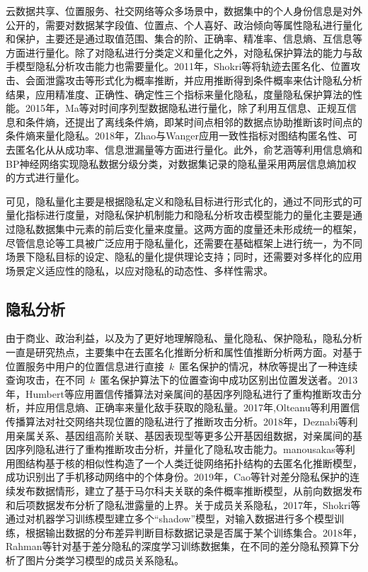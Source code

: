云数据共享、位置服务、社交网络等众多场景中，数据集中的个人身份信息是对外公开的，需要对数据某字段值、位置点、个人喜好、政治倾向等属性隐私进行量化和保护，主要还是通过取值范围、集合的阶、正确率、精准率、信息熵、互信息等方面进行量化\cite{xiong2018research,wagner2018technical}。除了对隐私进行分类定义和量化之外，对隐私保护算法的能力与敌手模型隐私分析攻击能力也需要量化。2011年，Shokri等\cite{shokri2011quantifying}将轨迹去匿名化、位置攻击、会面泄露攻击等形式化为概率推断，并应用推断得到条件概率来估计隐私分析结果，应用精准度、正确性、确定性三个指标来量化隐私，度量隐私保护算法的性能。2015年，Ma等\cite{ma2015information}对时间序列型数据隐私进行量化，除了利用互信息、正规互信息和条件熵，还提出了离线条件熵，即某时间点相邻的数据点协助推断该时间点的条件熵来量化隐私。2018年，Zhao与Wanger\cite{zhao2018evaluating}应用一致性指标对图结构匿名性、可去匿名化从从成功率、信息泄漏量等方面进行量化。此外，俞艺涵等\cite{yu2018shannon}利用信息熵和BP神经网络实现隐私数据分级分类，对数据集记录的隐私量采用两层信息熵加权的方式进行量化。

可见，隐私量化主要是根据隐私定义和隐私目标进行形式化的，通过不同形式的可量化指标进行度量，对隐私保护机制能力和隐私分析攻击模型能力的量化主要是通过隐私数据集中元素的前后变化量来度量。这两方面的度量还未形成统一的框架，尽管信息论等工具被广泛应用于隐私量化，还需要在基础框架上进行统一，为不同场景下隐私目标的设定、隐私的量化提供理论支持；同时，还需要对多样化的应用场景定义适应性的隐私，以应对隐私的动态性、多样性需求。

\subsection{隐私分析}
由于商业、政治利益，以及为了更好地理解隐私、量化隐私、保护隐私，隐私分析一直是研究热点，主要集中在去匿名化推断分析和属性值推断分析两方面。对基于位置服务中用户的位置信息进行直接~$k$~匿名保护的情况，林欣等提出了一种连续查询攻击\cite{lin2009lbs}，在不同~$k$~匿名保护算法下的位置查询中成功区别出位置发送者。2013年，Humbert等\cite{humbert2013addressing}应用置信传播算法对亲属间的基因序列隐私进行了重构推断攻击分析，并应用信息熵、正确率来量化敌手获取的隐私量。2017年,Olteanu等\cite{olteanu2017quantifying}利用置信传播算法对社交网络共现位置的隐私进行了推断攻击分析。2018年，Deznabi等\cite{deznabi2018inference}利用亲属关系、基因组高阶关联、基因表现型等更多公开基因组数据，对亲属间的基因序列隐私进行了重构推断攻击分析，并量化了隐私攻击能力。manousakas等\cite{manousakas2018quantifying}利用图结构基于核的相似性构造了一个人类迁徙网络拓扑结构的去匿名化推断模型，成功识别出了手机移动网络中的个体身份。2019年，Cao等\cite{cao2019quantifying}针对差分隐私保护的连续发布数据情形，建立了基于马尔科夫关联的条件概率推断模型，从前向数据发布和后项数据发布分析了隐私泄露量的上界。关于成员关系隐私，2017年，Shokri等\cite{shokri2017membership}通过对机器学习训练模型建立多个“shadow”模型，对输入数据进行多个模型训练，根据输出数据的分布差异判断目标数据记录是否属于某个训练集合。2018年，Rahman等\cite{rahman2018membership}针对基于差分隐私的深度学习训练数据集，在不同的差分隐私预算下分析了图片分类学习模型的成员关系隐私。


